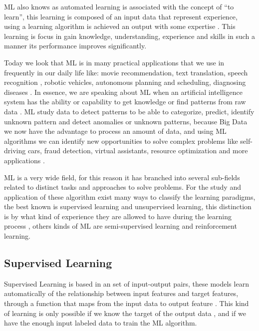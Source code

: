 \documentclass[12pt]{report}
\begin{document}
\ac{ML} also knows as automated learning is associated with the concept of “to learn”, this learning is composed of an input data that represent experience, using a learning algorithm is achieved an output with some expertise \cite{Shai2014}. This learning is focus in gain knowledge, understanding, experience and skills \cite{Nilsson1998} in such a manner its performance improves significantly.

Today we look that \ac{ML} is in many practical applications that we use in frequently in our daily life like: movie recommendation, text translation, speech recognition \cite{Goodfellow2016}, robotic vehicles, autonomous planning and scheduling, diagnosing diseases \cite{Russell2010}. In essence, we are speaking about \ac{ML} when an artificial intelligence system has the ability or capability to get knowledge or find patterns from raw data \cite{Goodfellow2016}. \ac{ML} study data to detect patterns to be able to categorize, predict, identify unknown pattern and detect anomalies or unknown patterns, because Big Data we now have the advantage to process an amount of data, and using {ML} algorithms we can identify new opportunities to solve complex problems like self-driving cars, fraud detection, virtual assistants, resource optimization and more applications \cite{Nevala2017}.

\ac{ML} is a very wide field, for this reason it has branched into several sub-fields related to distinct tasks \cite{Shai2014} and approaches to solve problems. For the study and application of these algorithm exist many ways to classify the learning paradigms, the best known is supervised learning and unsupervised learning, this distinction is by what kind of experience they are allowed to have during the learning process \cite{Goodfellow2016}, others kinds of {ML} are semi-supervised learning and reinforcement learning.


\subsection{Supervised Learning}

Supervised Learning is based in an set of input-output pairs, these models learn automatically of the relationship between input features and target features, through a function that maps from the input data to output feature \cite{Russell2010} \cite{ Kelleher2015}. This kind of learning is only possible if we know the target of the output data \cite{Nilsson1998}, and if we have the enough input labeled data to train the {ML} algorithm.
\end{document}
